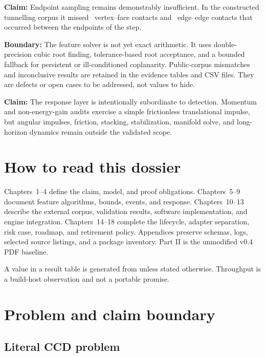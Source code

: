 \documentclass[11pt,a4paper,oneside]{book}
\newcommand{\claim}[1]{\textbf{Claim:} #1}
\newcommand{\boundary}[1]{\textbf{Boundary:} #1}
\begin{document}
\claim{Endpoint sampling remains demonstrably insufficient.} In the constructed tunnelling corpus it missed \SyntheticVFEndpointMisses\ vertex--face contacts and \SyntheticEEEndpointMisses\ edge--edge contacts that occurred between the endpoints of the step.

\boundary{The feature solver is not yet exact arithmetic.} It uses double-precision cubic root finding, tolerance-based root acceptance, and a bounded fallback for persistent or ill-conditioned coplanarity. Public-corpus mismatches and inconclusive results are retained in the evidence tables and CSV files. They are defects or open cases to be addressed, not values to hide.

\claim{The response layer is intentionally subordinate to detection.} Momentum and non-energy-gain audits exercise a simple frictionless translational impulse, but angular impulses, friction, stacking, stabilization, manifold solve, and long-horizon dynamics remain outside the validated scope.

\chapter*{How to read this dossier}

Chapters~1--4 define the claim, model, and proof obligations. Chapters~5--9 document feature algorithms, bounds, events, and response. Chapters~10--13 describe the external corpus, validation results, software implementation, and engine integration. Chapters~14--18 complete the lifecycle, adapter separation, risk case, roadmap, and retirement policy. Appendices preserve schemas, logs, selected source listings, and a package inventory. Part II is the unmodified v0.4 PDF baseline.

A value in a result table is generated from  unless stated otherwise. Throughput is a build-host observation and not a portable promise.

\tableofcontents
\listoffigures
\listoftables

\mainmatter

\chapter{Problem and claim boundary}
\section{Literal CCD problem}
\end{document}
